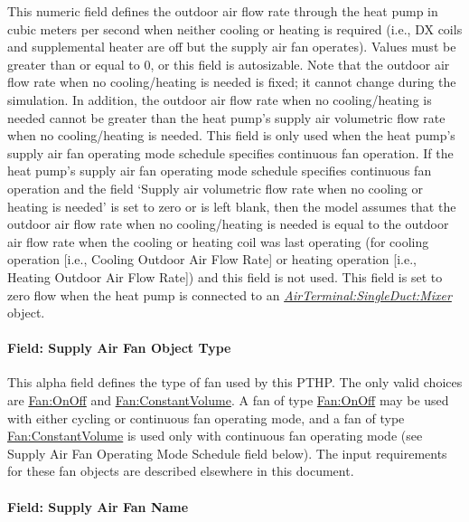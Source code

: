 This numeric field defines the outdoor air flow rate through the heat pump in cubic meters per second when neither cooling or heating is required (i.e., DX coils and supplemental heater are off but the supply air fan operates). Values must be greater than or equal to 0, or this field is autosizable. Note that the outdoor air flow rate when no cooling/heating is needed is fixed; it cannot change during the simulation. In addition, the outdoor air flow rate when no cooling/heating is needed cannot be greater than the heat pump's supply air volumetric flow rate when no cooling/heating is needed. This field is only used when the heat pump's supply air fan operating mode schedule specifies continuous fan operation. If the heat pump's supply air fan operating mode schedule specifies continuous fan operation and the field `Supply air volumetric flow rate when no cooling or heating is needed' is set to zero or is left blank, then the model assumes that the outdoor air flow rate when no cooling/heating is needed is equal to the outdoor air flow rate when the cooling or heating coil was last operating (for cooling operation {[}i.e., Cooling Outdoor Air Flow Rate{]} or heating operation {[}i.e., Heating Outdoor Air Flow Rate{]}) and this field is not used. This field is set to zero flow when the heat pump is connected to an \textit{\hyperref[airterminalsingleductmixer]{AirTerminal:SingleDuct:Mixer}} object.

\paragraph{Field: Supply Air Fan Object Type}\label{field-supply-air-fan-object-type-6}

This alpha field defines the type of fan used by this PTHP. The only valid choices are \hyperref[fanonoff]{Fan:OnOff} and \hyperref[fanconstantvolume]{Fan:ConstantVolume}. A fan of type \hyperref[fanonoff]{Fan:OnOff} may be used with either cycling or continuous fan operating mode, and a fan of type \hyperref[fanconstantvolume]{Fan:ConstantVolume} is used only with continuous fan operating mode (see Supply Air Fan Operating Mode Schedule field below). The input requirements for these fan objects are described elsewhere in this document.

\paragraph{Field: Supply Air Fan Name}\label{field-supply-air-fan-name-5}

